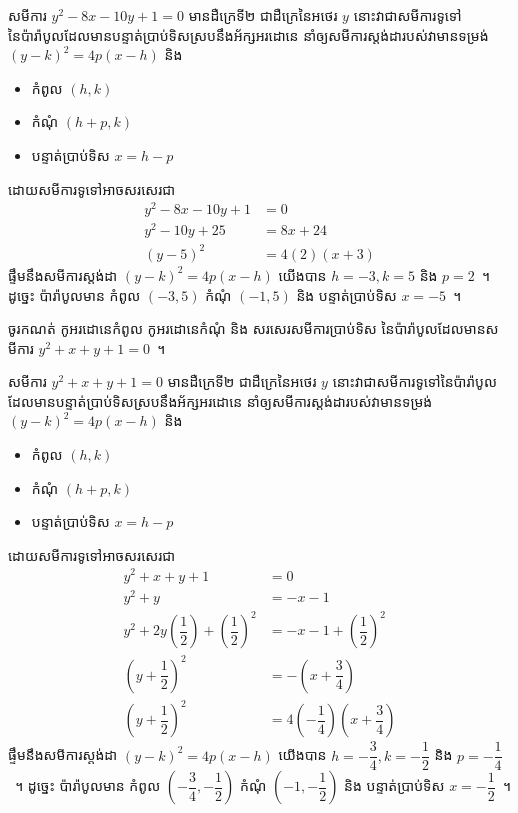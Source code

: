 \begin{answer}
	សមីការ $ y^2-8x-10y+1=0 $ មានដឺក្រេទី២ ជាដឺក្រេនៃអថេរ $ y $ នោះវាជាសមីការទូទៅនៃប៉ារ៉ាបូលដែលមានបន្ទាត់ប្រាប់ទិសស្របនឹងអ័ក្សអរដោនេ នាំឲ្យសមីការស្តង់ដារបស់វាមានទម្រង់ $ (y-k)^2=4p(x-h) $ និង
	\begin{itemize}
		\item កំពូល $ (h,k) $
		\item កំណុំ $ (h+p,k) $
		\item បន្ទាត់ប្រាប់ទិស $ x=h-p $
	\end{itemize}
	ដោយសមីការទូទៅអាចសរសេរជា
	\begin{align*}
	y^2-8x-10y+1 &=0\\
	y^2-10y+25 &=8x+24\\
	(y-5)^2 &=4(2)(x+3)
	\end{align*}
	ផ្ទឹមនឹងសមីការស្តង់ដា $ (y-k)^2=4p(x-h) $ យើងបាន $ h=-3,k=5 $ និង $ p=2 $~។ ដូច្នេះ ប៉ារ៉ាបូលមាន​ កំពូល $ (-3,5) $ កំណុំ $ (-1,5) $ និង បន្ទាត់ប្រាប់ទិស $ x=-5 $~។
\end{answer}
%
\begin{example*}
	ចូរកណត់ កូអរដោនេ​កំពូល កូអរដោនេ​កំណុំ និង សរសេរសមីការប្រាប់ទិស នៃប៉ារ៉ាបូលដែលមានសមីការ $ y^2+x+y+1=0 $~។
\end{example*}
%
\begin{answer}
	សមីការ $ y^2+x+y+1=0 $ មានដឺក្រេទី២ ជាដឺក្រេនៃអថេរ $ y $ នោះវាជាសមីការទូទៅនៃប៉ារ៉ាបូលដែលមានបន្ទាត់ប្រាប់ទិសស្របនឹងអ័ក្សអរដោនេ នាំឲ្យសមីការស្តង់ដារបស់វាមានទម្រង់ $ (y-k)^2=4p(x-h) $ និង
	\begin{itemize}
		\item កំពូល $ (h,k) $
		\item កំណុំ $ (h+p,k) $
		\item បន្ទាត់ប្រាប់ទិស $ x=h-p $
	\end{itemize}
	ដោយសមីការទូទៅអាចសរសេរជា
	\begin{align*}
	y^2+x+y+1 &=0\\
	y^2+y &=-x-1\\
	y^2+2y\left(\dfrac{1}{2}\right)+\left(\dfrac{1}{2}\right)^2 &=-x-1+\left(\dfrac{1}{2}\right)^2\\
	\left(y+\dfrac{1}{2}\right)^2 &=-\left(x+\dfrac{3}{4}\right)\\
	\left(y+\dfrac{1}{2}\right)^2 &=4\left(-\dfrac{1}{4}\right)\left(x+\dfrac{3}{4}\right)
	\end{align*}
	ផ្ទឹមនឹងសមីការស្តង់ដា $ (y-k)^2=4p(x-h) $ យើងបាន $ h=-\dfrac{3}{4},k=-\dfrac{1}{2} $ និង $ p=-\dfrac{1}{4} $~។ ដូច្នេះ ប៉ារ៉ាបូលមាន​ កំពូល $ \left(-\dfrac{3}{4},-\dfrac{1}{2}\right) $ កំណុំ $ \left(-1,-\dfrac{1}{2}\right) $ និង បន្ទាត់ប្រាប់ទិស $ x=-\dfrac{1}{2} $~។
\end{answer}
%
